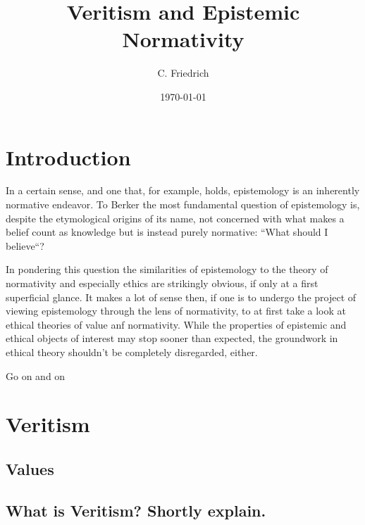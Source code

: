 \documentclass[11pt,numbers=noenddot]{scrartcl}
\title{Veritism and Epistemic Normativity}
\author{C. Friedrich}
\date{\today}
\begin{document}
\begin{titlepage}
\maketitle


\thispagestyle{empty}
\end{titlepage}

\tableofcontents
\newpage

\section{Introduction}

In a certain sense, and one that, for example, \citet{Berker2013-BERETA-2} holds, epistemology is an inherently normative endeavor. To Berker the most fundamental question of epistemology is, despite the etymological origins of its name, not concerned with what makes a belief count as knowledge but is instead purely normative: “What should I believe“?

In pondering this question the similarities of epistemology to the theory of normativity and especially ethics are strikingly obvious, if only at a first superficial glance. It makes a lot of sense then, if one is to undergo the project of viewing epistemology through the lens of normativity, to at first take a look at ethical theories of value anf normativity. While the properties of epistemic and ethical objects of interest may stop sooner than expected, the groundwork in ethical theory shouldn't be completely disregarded, either.

Go on and on

\section{Veritism}

\subsection{Values}
\subsection{ What is Veritism? Shortly explain.}
\end{document}
